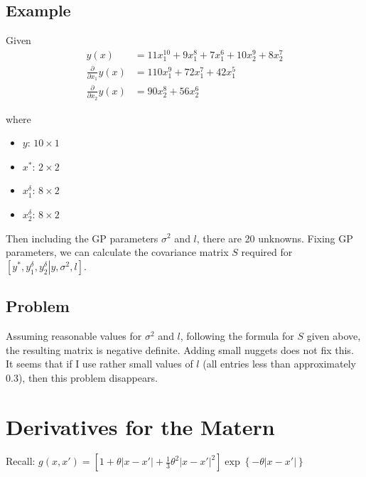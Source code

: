 \documentclass[12pt]{amsart}
\begin{document}
\bigskip
\subsection{Example}
Given
\begin{align}
y\left( x \right) &= 11x_1^{10} + 9x_1^8 + 7x_1^6 + 10x_2^9 + 8x_2^7\\
\frac{\partial }{{\partial {x_1}}}y\left( x \right) &= 110x_1^9 + 72x_1^7 + 42x_1^5\\
\frac{\partial }{{\partial {x_2}}}y\left( x \right) &= 90x_2^8 + 56x_2^6
\end{align}

where 

\begin{itemize}
  \item $y$: $10 \times 1$
  \item $x^*$: $2 \times 2$
  \item $x^\delta_1$: $8 \times 2$
  \item $x^\delta_2$: $8 \times 2$
\end{itemize}

Then including the GP parameters $\sigma^2$ and $l$, there are 20 unknowns. Fixing GP parameters, we can calculate the covariance matrix $S$ required for $\left[ {{y^*},y_1^\delta ,y_2^\delta \left| {y,{\sigma ^2},l} \right.} \right]$.


\bigskip
\subsection{Problem}
Assuming reasonable values for $\sigma^2$ and $l$, following the formula for $S$ given above, the resulting matrix is negative definite. Adding small nuggets does not fix this. \\

It seems that if I use rather small values of $l$ (all entries less than approximately 0.3), then this problem disappears. 

\bigskip
\section{Derivatives for the Matern}
Recall: $g\left( {x,x'} \right) = \left[ {1 + \theta \left| {x - x'} \right| + \frac{1}{3}{\theta ^2}{{\left| {x - x'} \right|}^2}} \right]\exp \left\{ { - \theta \left| {x - x'} \right|} \right\}$
\end{document}

